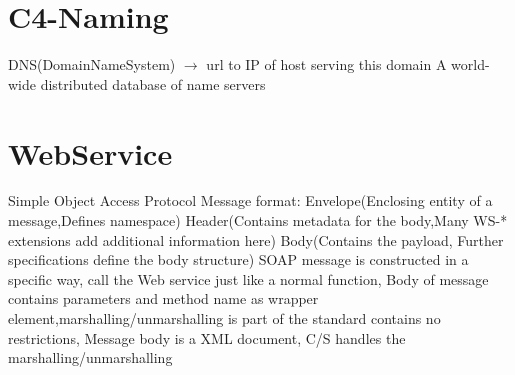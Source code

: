 \section{C4-Naming}
 DNS(DomainNameSystem) $\rightarrow$ url to IP of host serving this domain
\textbar A world-wide distributed database of name servers

\section{WebService}
Simple Object Access Protocol
Message format: Envelope(Enclosing entity of a message,Defines namespace)
Header(Contains metadata for the body,Many WS-* extensions add additional information here)
Body(Contains the payload, Further specifications define the body structure)
SOAP message is constructed in a specific way, call the Web service just like a normal function, Body of message contains parameters and method name as wrapper element,marshalling/unmarshalling is part of the standard
\textbar contains no restrictions, Message body is a XML document, C/S handles the marshalling/unmarshalling